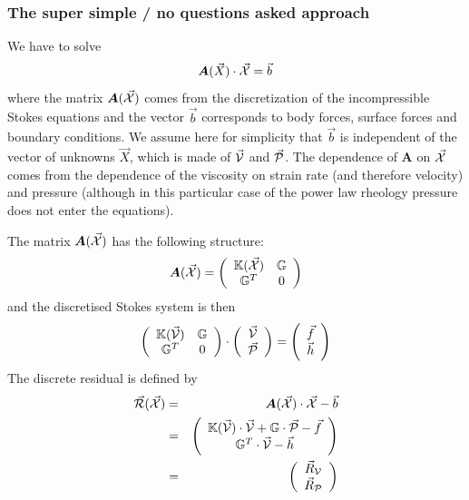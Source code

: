 \subsubsection*{The super simple / no questions asked approach}


We have to solve 
\[
{\bm A}(\vec{X}) \cdot \vec{\cal X} = \vec{b}
\]
where the matrix ${\bm A}(\vec{\cal X})$ comes from the discretization of the incompressible
Stokes equations and the vector $\vec{b}$ corresponds to body forces, surface forces and 
boundary conditions. We assume here for simplicity that $\vec{b}$
is independent of the vector of unknowns $\vec{X}$, which is made of
$\vec{\cal V}$ and $\vec{\cal P}$. The dependence of ${\bm A}$ on $\vec{\cal X}$ 
comes from the dependence of the viscosity on strain rate (and therefore velocity)
and pressure (although in this particular case of the power law rheology pressure does 
not enter the equations). 

The matrix ${\bm A}(\vec{\cal X})$ has the following structure:
\begin{equation}
{\bm A}(\vec{\cal X}) = 
\left(
\begin{array}{cc}
{\mathbb{K}}(\vec{\cal X}) & {\mathbb{G}}  \\
{\mathbb{G}}^T & 0 
\end{array}
\right)
\end{equation} 
and the discretised Stokes system is then
\begin{equation}
\left(
\begin{array}{cc}
{\mathbb{K}}(\vec{\cal V}) & {\mathbb{G}}  \\
{\mathbb{G}}^T & 0 
\end{array}
\right)
\cdot
\left(
\begin{array}{cc}
\vec{\cal V} \\
\vec{\cal P} \\
\end{array}
\right)
=
\left(
\begin{array}{cc}
\vec{f} \\ \vec{h}
\end{array}
\right)
\end{equation}
The discrete residual is defined by 
\begin{eqnarray}
\vec{\cal R}(\vec{\cal X}) 
&=& {\bm A}(\vec{\cal X})\cdot \vec{\cal X} - \vec{b} \label{eq:f87_res} \\
&=& 
\left(
\begin{array}{c}
{\mathbb{K}}(\vec{\cal V}) \cdot \vec{\cal V} + {\mathbb{G}} \cdot \vec{\cal P} - \vec{f} \\
{\mathbb{G}}^T \cdot \vec{\cal V} - \vec{h}
\end{array}
\right) \\
&=&
\left(
\begin{array}{cc}
\vec{R}_{\cal V} \\
\vec{R}_{\cal P} 
\end{array}
\right)
\end{eqnarray}



